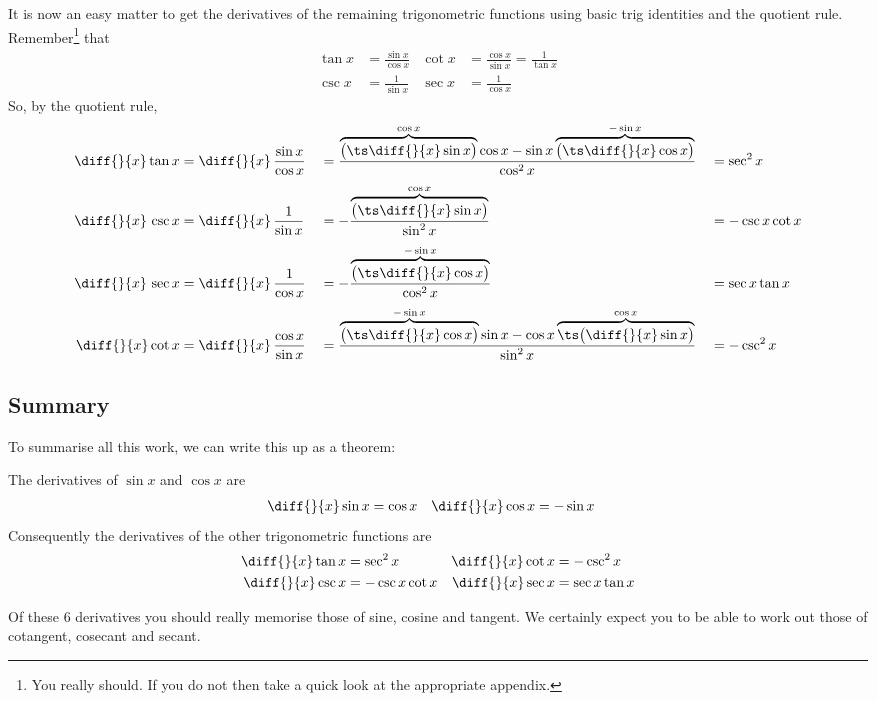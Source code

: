 It is now an easy matter to get the derivatives of the remaining
trigonometric functions using basic trig identities and the
quotient rule. Remember\footnote{You really should. If you do not then take a
quick look at the appropriate appendix.} that
\begin{align*}
  \tan x&=  \frac{\sin x}{\cos x} & \cot x &= \frac{\cos x}{\sin x}=
\frac{1}{\tan x} \\
  \csc x&=  \frac{1}{\sin x} & \sec x &= \frac{1}{\cos x}
\end{align*}
So, by the quotient rule,
\begin{alignat*}{7}
\diff{}{x}\tan x
&=\diff{}{x}\,\frac{\sin x}{\cos x} &
&=\frac{ \overbrace{\big({\ts\diff{}{x}}\sin x\big)}^{\cos x}\cos x
       -\sin x\overbrace{\big({\ts\diff{}{x}\cos x}\big)}^{-\sin x}}
                         {\cos^2 x} &
&=\sec^2 x \\[0.05in]
\diff{}{x}\,\csc x
&=\diff{}{x}\,\frac{1}{\sin x} &
&=-\frac{ \overbrace{\big({\ts\diff{}{x}}\sin x\big)}^{\cos x}}
                         {\sin^2 x} &
&=-\csc x\cot x \\[0.05in]
\diff{}{x}\,\sec x
&=\diff{}{x}\,\frac{1}{\cos x} &
&=-\frac{\overbrace{\big({\ts\diff{}{x}}\cos x\big)}^{-\sin x}}
                         {\cos^2 x} &
&=\sec x\tan x \\[0.05in]
\diff{}{x}\cot x
&=\diff{}{x}\,\frac{\cos x}{\sin x} &
&=\frac{ \overbrace{\big({\ts\diff{}{x}}\cos x\big)}^{-\sin x}\sin x
       -\cos x\overbrace{{\ts\big(\diff{}{x}}\sin x\big)}^{\cos x}}
                         {\sin^2 x} &
&=-\csc^2 x
\end{alignat*}

\goodbreak
\subsection*{Summary}
To summarise all this work, we can write this up as a theorem:
\begin{theorem}\label{thm:DIFFtrigDerivs}
 The derivatives of $\sin x$ and $\cos x$ are
\begin{align*}
  \diff{}{x} \sin x &= \cos x & \diff{}{x} \cos x &= - \sin x
\end{align*}
Consequently the derivatives of the other trigonometric functions are
\begin{align*}
  \diff{}{x} \tan x &= \sec^2 x &
  \diff{}{x} \cot x &= -\csc^2 x \\
  \diff{}{x} \csc x &= -\csc x \cot x &
  \diff{}{x} \sec x &= \sec x \tan x
\end{align*}
\end{theorem}
Of these 6 derivatives you should really memorise those of sine, cosine and tangent. We
certainly expect you to be able to work out those of cotangent, cosecant and secant.


